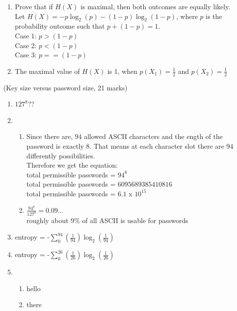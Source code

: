 \documentclass{assignment}
\begin{document}
\begin{problemlist}
\begin{problem}
\begin{answer}
\begin{enumerate}[label=(\alph*)]
	\item 	Prove that if $H(X)$ is maximal, then both outcomes are equally likely. \\
			Let $H(X) = -p \log_2 (p) - (1-p) \log_2 (1-p)$, where $p$ is the probability 
			outcome such that $p + (1-p) = 1$. \\
			Case 1: $ p > (1- p) $\\
			Case 2: $ p < (1- p) $\\
			Case 3: $ p == (1- p) $\\
		
			
	\item 	The maximal value of $H(X)$ is 1, when $p(X_1) = \frac{1}{2}$ and $p(X_2) = \frac{1}{2}$
\end{enumerate}
\end{answer}
\end{problem}

\clearpage

\pbitem (Key size versus password size, 21 marks)
\begin{problem}
\begin{answer}
\begin{enumerate}[label=(\alph*)]
	\item	$127^8$??
	\item 	\begin{enumerate}[label=(\roman*)]
			\item Since there are, $94$ allowed ASCII characters and the ength of the password is exactly $8$. That means at each character slot there are $94$ differently possibilities.\\
			Therefore we get the equation:\\
				total permissible passwords = $94^8$ \\
				total permissible passwords = $6095689385410816$ \\
				total permissible passwords = $6.1$ x $10^{15}$ \\
			
			\item $\frac{94^8}{127^8} = 0.09... $ \\
				  roughly about 9\% of all ASCII is usable for passwords
			\end{enumerate}
	\item entropy = -$\sum_{0}^{94} (\frac{1}{94})  \log_2(\frac{1}{94})$ 
	\item entropy = -$\sum_{0}^{26} (\frac{1}{26})  \log_2(\frac{1}{26})$
	\item 	\begin{enumerate}[label=(\roman*)]
			\item hello
			\item there
			\end{enumerate}
\end{enumerate}
\end{answer}
\end{problem}

\end{problemlist}
\end{document}
